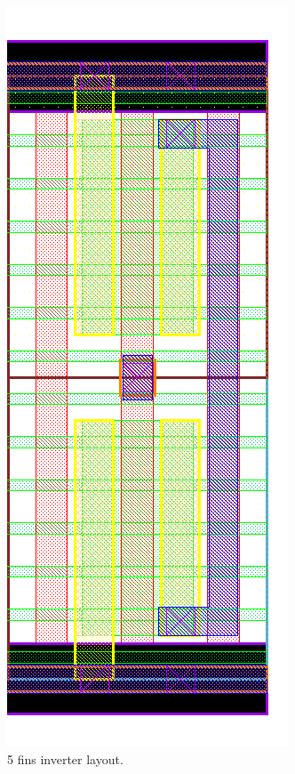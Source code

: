 \documentclass[pgmicro,mestrado,english]{iiufrgs}
\begin{document}
\begin{figure}[H]
\centering
\includegraphics[width=\textwidth,height=\textheight,keepaspectratio]{INV5F.png}
\caption{5 fins inverter layout.}
\label{fig:INV5F}
\end{figure}
\end{document}
